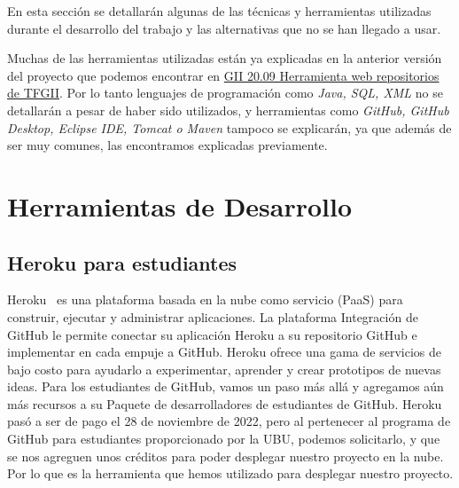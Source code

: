 En esta sección se detallarán algunas de las técnicas y herramientas utilizadas durante el desarrollo del trabajo y las alternativas que no se han llegado a usar.

Muchas de las herramientas utilizadas están ya explicadas en la anterior versión del proyecto que podemos encontrar en \href{https://github.com/dbo1001/Gestor-TFG-2021}{GII 20.09 Herramienta web repositorios de TFGII}. Por lo tanto lenguajes de programación como \emph{Java, SQL, XML} no se detallarán a pesar de haber sido utilizados, y herramientas como \emph{GitHub, GitHub Desktop, Eclipse IDE, Tomcat o Maven} tampoco se explicarán, ya que además de ser muy comunes, las encontramos explicadas previamente.

\section{Herramientas de Desarrollo}

\subsection{Heroku para estudiantes}
Heroku~\cite{heroku_students} es una plataforma basada en la nube como servicio (PaaS) para construir, ejecutar y administrar aplicaciones. 
La plataforma Integración de GitHub le permite conectar su aplicación Heroku a su repositorio GitHub e implementar en cada empuje a GitHub.
Heroku ofrece una gama de servicios de bajo costo para ayudarlo a experimentar, aprender y crear prototipos de nuevas ideas. Para los estudiantes de GitHub, vamos un paso más allá y agregamos aún más recursos a su Paquete de desarrolladores de estudiantes de GitHub. 
Heroku pasó a ser de pago el 28 de noviembre de 2022, pero al pertenecer al programa de GitHub para estudiantes proporcionado por la UBU, podemos solicitarlo, y que se nos agreguen unos créditos para poder desplegar nuestro proyecto en la nube. Por lo que es la herramienta que hemos utilizado para desplegar nuestro proyecto.


